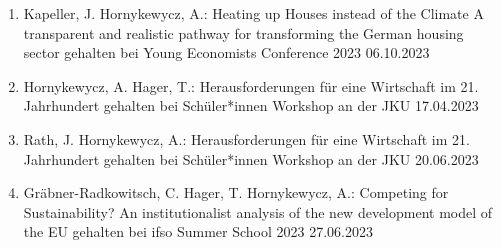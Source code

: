 \begin{enumerate}
	\item Kapeller, J. Hornykewycz, A.: Heating up Houses instead of the Climate A transparent and realistic pathway for transforming the German housing sector gehalten bei Young Economists Conference 2023 06.10.2023
	\item Hornykewycz, A. Hager, T.: Herausforderungen für eine Wirtschaft im 21. Jahrhundert gehalten bei Schüler*innen Workshop an der JKU 17.04.2023
	\item Rath, J. Hornykewycz, A.: Herausforderungen für eine Wirtschaft im 21. Jahrhundert gehalten bei Schüler*innen Workshop an der JKU 20.06.2023
	\item Gräbner-Radkowitsch, C. Hager, T. Hornykewycz, A.: Competing for Sustainability? An institutionalist analysis of the new development model of the EU gehalten bei ifso Summer School 2023 27.06.2023
\end{enumerate}
